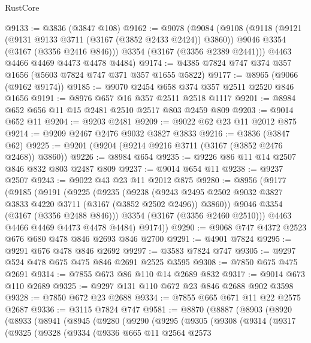 \begin{lexlean}{RustCore}
\begin{coremodule}
@9133 := @3836 (@3847 @108)
@9162 := @9078
    (@9084
      (@9108
        (@9118
          (@9121 (@9131 @9133 @3711 (@3167 (@3852 @2433 @2424)) @3860))
          @9046
          @3354
          (@3167 (@3356 @2416 @846)))
        @3354
        (@3167 (@3356 @2389 @2441)))
      @4463
      @4466
      @4469
      @4473
      @4478
      @4484)
@9174 := @4385 @7824 @747 @374 @357 @1656 (@5603 @7824 @747 @371 @357 @1655 @5822)
@9177 := @8965 (@9066 (@9162 @9174))
@9185 := @9070 @2454 @658 @374 @357 @2511 @2520 @846 @1656
@9191 := @8976 @657 @16 @357 @2511 @2518 @1117
@9201 := @8984 @652 @656 @11 @15 @2481 @2510 @2517 @803 @2459 @809
@9203 := @9014 @652 @11
@9204 := @9203 @2481
@9209 := @9022 @62 @23 @11 @2012 @875
@9214 := @9209 @2467 @2476 @9032 @3827 @3833
@9216 := @3836 (@3847 @62)
@9225 := @9201 (@9204 (@9214 @9216 @3711 (@3167 (@3852 @2476 @2468)) @3860))
@9226 := @8984 @654
@9235 := @9226 @86 @11 @14 @2507 @846 @832 @803 @2487 @809
@9237 := @9014 @654 @11
@9238 := @9237 @2507
@9243 := @9022 @43 @23 @11 @2012 @875
@9280 := @8956
    (@9177
      (@9185
        (@9191
          (@9225
            (@9235
              (@9238
                (@9243 @2495 @2502 @9032 @3827 @3833 @4220 @3711 (@3167 (@3852 @2502 @2496)) @3860))
              @9046
              @3354
              (@3167 (@3356 @2488 @846)))
            @3354
            (@3167 (@3356 @2460 @2510)))
          @4463
          @4466
          @4469
          @4473
          @4478
          @4484)
        @9174))
@9290 := @9068 @747 @4372 @2523 @676 @680 @478 @846 @2693 @846 @2700
@9291 := @4901 @7824
@9295 := @9291 @676 @478 @846 @2692
@9297 := @3583 @7824 @747
@9305 := @9297 @524 @478 @675 @475 @846 @2691 @2525 @3595
@9308 := @7850 @675 @475 @2691
@9314 := @7855 @673 @86 @110 @14 @2689 @832
@9317 := @9014 @673 @110 @2689
@9325 := @9297 @131 @110 @672 @23 @846 @2688 @902 @3598
@9328 := @7850 @672 @23 @2688
@9334 := @7855 @665 @671 @11 @22 @2575 @2687
@9336 := @3115 @7824 @747
@9581 := @8870
    (@8887
      (@8903
        (@8920
          (@8933
            (@8941
              (@8945
                (@9280
                  (@9290
                    (@9295
                      (@9305
                        (@9308
                          (@9314
                            (@9317
                              (@9325
                                (@9328
                                  (@9334
                                    (@9336
                                      @665
                                      @11
                                      @2564
                                      @2573

\end{coremodule}
\end{lexlean}
